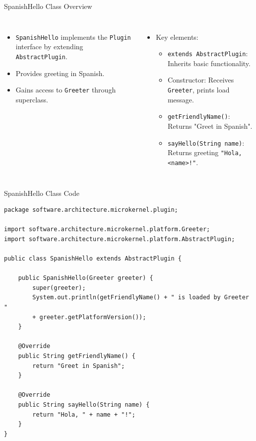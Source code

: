 \documentclass[aspectratio=169, table]{beamer}
\begin{document}
\begin{frame}{SpanishHello Class Overview}
\vspace{20pt}
\begin{columns}[t]
\begin{itemize}
	\item \texttt{SpanishHello} implements the \texttt{Plugin} interface by extending \texttt{AbstractPlugin}.
	\item Provides greeting in Spanish.
	\item Gains access to \texttt{Greeter} through superclass.
\end{itemize}
\begin{itemize}
	\item Key elements:
	\begin{itemize}
		\item \texttt{extends AbstractPlugin}: Inherits basic functionality.
		\item Constructor: Receives \texttt{Greeter}, prints load message.
		\item \texttt{getFriendlyName()}: Returns "Greet in Spanish".
		\item \texttt{sayHello(String name)}: Returns greeting \texttt{"Hola, <name>!"}.
	\end{itemize}
\end{itemize}
\end{columns}
\end{frame}

\begin{frame}[fragile]{SpanishHello Class Code}
\vspace{20pt}
\begin{lstlisting}[style=JavaStyle, basicstyle=\tiny\ttfamily]
package software.architecture.microkernel.plugin;

import software.architecture.microkernel.platform.Greeter;
import software.architecture.microkernel.platform.AbstractPlugin;

public class SpanishHello extends AbstractPlugin {
	
	public SpanishHello(Greeter greeter) {
		super(greeter);
		System.out.println(getFriendlyName() + " is loaded by Greeter "
		+ greeter.getPlatformVersion());
	}
	
	@Override
	public String getFriendlyName() {
		return "Greet in Spanish";
	}
	
	@Override
	public String sayHello(String name) {
		return "Hola, " + name + "!";
	}
}
\end{lstlisting}
\end{frame}
\end{document}
